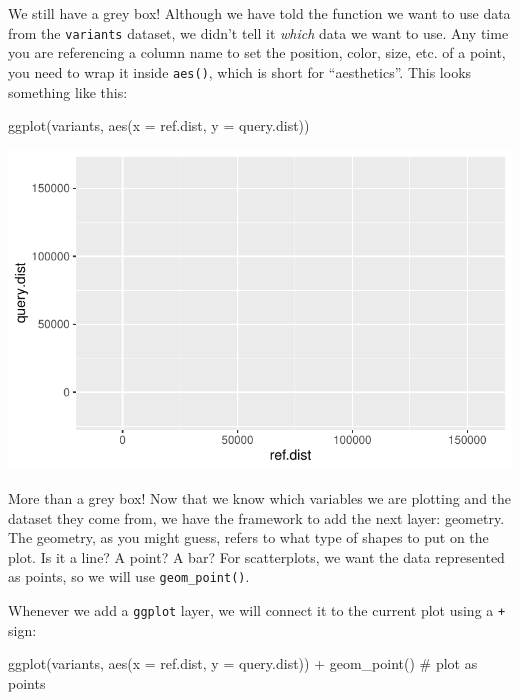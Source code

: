\documentclass[
  letterpaper,
  DIV=11,
  numbers=noendperiod]{scrreprt}
\newenvironment{Shaded}{\begin{snugshade}}{\end{snugshade}}
\newcommand{\AttributeTok}[1]{\textcolor[rgb]{0.40,0.45,0.13}{#1}}
\newcommand{\CommentTok}[1]{\textcolor[rgb]{0.37,0.37,0.37}{#1}}
\newcommand{\FunctionTok}[1]{\textcolor[rgb]{0.28,0.35,0.67}{#1}}
\newcommand{\NormalTok}[1]{\textcolor[rgb]{0.00,0.23,0.31}{#1}}
\newcommand{\SpecialCharTok}[1]{\textcolor[rgb]{0.37,0.37,0.37}{#1}}
\begin{document}
We still have a grey box! Although we have told the function we want to
use data from the \texttt{variants} dataset, we didn't tell it
\emph{which} data we want to use. Any time you are referencing a column
name to set the position, color, size, etc. of a point, you need to wrap
it inside \texttt{aes()}, which is short for ``aesthetics''. This looks
something like this:

\begin{Shaded}
\begin{Highlighting}[]
\FunctionTok{ggplot}\NormalTok{(variants, }\FunctionTok{aes}\NormalTok{(}\AttributeTok{x =}\NormalTok{ ref.dist, }\AttributeTok{y =}\NormalTok{ query.dist))}
\end{Highlighting}
\end{Shaded}

\includegraphics{scripts/02_dataViz/class3_files/figure-pdf/unnamed-chunk-9-1.pdf}

More than a grey box! Now that we know which variables we are plotting
and the dataset they come from, we have the framework to add the next
layer: geometry. The geometry, as you might guess, refers to what type
of shapes to put on the plot. Is it a line? A point? A bar? For
scatterplots, we want the data represented as points, so we will use
\texttt{geom\_point()}.

Whenever we add a \texttt{ggplot} layer, we will connect it to the
current plot using a \texttt{+} sign:

\begin{Shaded}
\begin{Highlighting}[]
\FunctionTok{ggplot}\NormalTok{(variants, }\FunctionTok{aes}\NormalTok{(}\AttributeTok{x =}\NormalTok{ ref.dist, }\AttributeTok{y =}\NormalTok{ query.dist)) }\SpecialCharTok{+}
  \FunctionTok{geom\_point}\NormalTok{() }\CommentTok{\# plot as points}
\end{Highlighting}
\end{Shaded}
\end{document}
